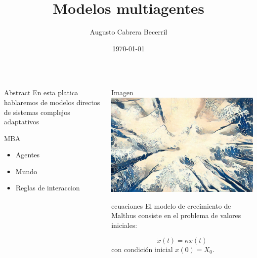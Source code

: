 \documentclass{beamer}
\title{Modelos multiagentes}
\author{Augusto Cabrera Becerril}
\date{\today}
\institute{Facultad de Ciencias UNAM}
\begin{document}
\begin{frame}[fragile]
    \begin{columns}[T]
    \begin{column}{0.33\textwidth}
    \begin{block}{Abstract}
       En esta platica  hablaremos de modelos directos de sistemas complejos adaptativos 
    \end{block}
    
    \begin{block}{MBA}
       \begin{itemize}
        \item Agentes
        \item Mundo
        \item Reglas de interaccion
        \end{itemize}
    \end{block}
    \end{column}

    \begin{column}{0.33\textwidth}
        \begin{block}{Imagen}
            \includegraphics[width=\textwidth]{imagen1.jpg}
        \end{block}
        \begin{block}{ecuaciones}
            El modelo de crecimiento de Malthus consiste en el problema de valores iniciales:

\begin{equation}
    \dot{x}(t)=\kappa x(t)
\end{equation}
con condición inicial $x(0)=X_0$.


\end{block}
\end{column}
\end{columns}
\end{frame}
\end{document}
